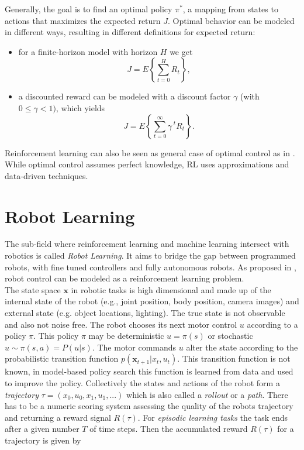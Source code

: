 Generally, the goal is to find an optimal policy $\pi^*$,
a mapping from states to actions that
maximizes the expected return $J$.
Optimal behavior can be modeled in
different ways, resulting in different
definitions for expected return:
\begin{itemize}
\item for a finite-horizon model with horizon $H$ we get
$$ J = E \left\{\sum^H_{t=0} R_t \right\}, $$

\item a discounted reward can be modeled with
  a discount factor $\gamma$ (with $0 \leq \gamma < 1)$, which yields
$$ J = E \left\{\sum^{\infty}_{t=0} \gamma^{\; t} R_t \right\}. $$
\end{itemize}

Reinforcement learning can also be seen as
general case of optimal control as in \citet{sutton1992reinforcement}.
While optimal control assumes perfect knowledge, RL uses approximations
and data-driven techniques.



\section{Robot Learning}
The sub-field where reinforcement learning and machine learning
intersect with robotics is called \textit{Robot Learning}. It aims to bridge
the gap between programmed robots,
with fine tuned controllers  and fully autonomous robots.
As proposed in \citet{deisenroth2013survey}, robot control can be modeled as
a reinforcement learning problem. \\
The state space $\mathbf{x}$ in robotic tasks is high dimensional and
made up of
the internal state of the robot (e.g., joint position, body position,
camera images)
and external state (e.g. object locations, lighting). The true state is
not observable and also not noise free. 
The robot chooses its next motor control $u$ according to a policy $\pi$.
This policy $\pi$ may
be deterministic $u = \pi(s)$ or stochastic $u \sim \pi(s,a) = P(u | s)$.
The motor commands $u$ alter the state according to the probabilistic
transition function $p(\mathbf{x}_{t+1} | x_t, u_t)$. This transition function
is not known, in model-based policy search this function is learned from data and
used to improve the policy.
Collectively the states and actions of the robot form a
\textit{trajectory} $\tau = (x_0, u_0, x_1, u_1,...)$ which is also called
a \textit{rollout} or a \textit{path}.
There has to be a numeric scoring system assessing the quality
of the robots trajectory and returning a reward signal $R(\tau)$.
For \textit{episodic learning tasks} the task ends after a given number $T$ of time
steps. Then the accumulated reward $R(\tau)$ for a trajectory is given by

